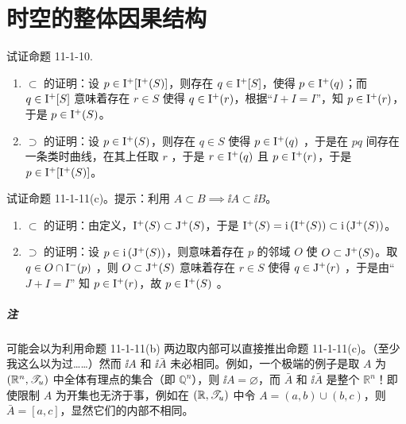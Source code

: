 \chapter{时空的整体因果结构}

\begin{xiti}
    \item 试证命题 11-1-10.

    \begin{zm}
        \begin{enumerate}
            \item $\subset$ 的证明：设 $p \in \mathrm{I}^+[\mathrm{I}^+(S)]$，则存在 $q \in \mathrm{I}^+[S] $，使得 $p \in \mathrm{I}^+(q)$；而 $q \in \mathrm{I}^+ [S]$ 意味着存在 $r \in S$ 使得 $q \in \mathrm{I}^+ (r)$，根据“$I+I=I$”，知 $p \in \mathrm{I}^+(r)$，于是 $p \in \mathrm{I}^+(S)$。
            \item $\supset$ 的证明：设 $p \in \mathrm{I}^+(S)$，则存在 $q \in S$ 使得 $p \in \mathrm{I}^+(q)$ ，于是在 $pq$ 间存在一条类时曲线，在其上任取 $r$ ，于是 $r \in \mathrm{I}^+(q)$ 且 $p \in \mathrm{I}^+(r)$，于是 $p \in \mathrm{I}^+[\mathrm{I}^+(S)]$。
        \end{enumerate}
    \end{zm}

    \item 试证命题 11-1-11(c)。提示：利用 $A \subset B \implies \ii{A} \subset \ii{B}$。

    \begin{zm}
        \begin{enumerate}
            \item $\subset$ 的证明：由定义，$\mathrm{I}^+(S) \subset \mathrm{J}^+ (S)$，于是 $\mathrm{I}^+(S) = \mathrm{i}\left( \mathrm{I}^+ (S) \right) \subset \mathrm{i}\left( \mathrm{J}^+(S) \right)$。
            \item $\supset$ 的证明：设 $p \in \mathrm{i}\left( \mathrm{J}^+(S) \right)$，则意味着存在 $p$ 的邻域 $O$ 使 $O \subset \mathrm{J}^+(S)$。取 $q \in O \cap \mathrm{I}^-(p)$ ，则 $O \subset \mathrm{J}^+(S)$ 意味着存在 $r \in S$ 使得 $q\in \mathrm{J}^+(r)$ ，于是由“$J + I = I$” 知 $p \in \mathrm{I}^+(r)$，故 $p \in \mathrm{I}^+(S)$ 。
        \end{enumerate}

        \paragraph{注} 可能会以为利用命题 11-1-11(b) 两边取内部可以直接推出命题 11-1-11(c)。（至少我这么以为过……）然而 $\ii{A}$ 和 $\ii{\bar{A}}$ 未必相同。例如，一个极端的例子是取 $A$ 为 $\left(\mathbb{R}^n,\mathscr{T}_u\right)$ 中全体有理点的集合（即 $\mathbb{Q}^n$），则 $\ii{A}= \varnothing$，而 $\bar{A}$ 和 $\ii{\bar{A}}$ 是整个 $\mathbb{R}^n$！即使限制 $A$ 为开集也无济于事，例如在 $(\mathbb{R},\mathscr{T}_u)$ 中令 $A = (a,b) \cup (b,c)$，则 $\bar{A} = [a,c]$，显然它们的内部不相同。
    \end{zm}


\end{xiti}
